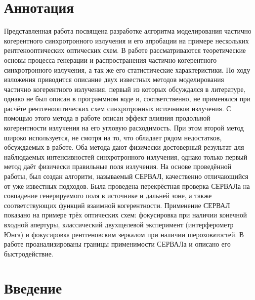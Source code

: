 \chapter*{Аннотация }							%
Представленная работа посвящена разработке алгоритма моделирования частично когерентного синхротронного излучения и его апробации на примере нескольких рентгенооптических оптических схем. В работе рассматриваются теоретические основы процесса генерации и распространения частично когерентного синхротронного излучения, а так же его статистические характеристики. По ходу изложения приводится описание двух известных методов моделирования частично когерентного излучения, первый из которых обсуждался в литературе, однако не был описан в программном коде и, соответственно, не применялся при расчёте рентгенооптических схем синхротронных источников излучения. С помощью этого метода в работе описан эффект влияния продольной когерентности излучения на его угловую расходимость. При этом второй метод широко используется, не смотря на то, что обладает рядом недостатков, обсуждаемых в работе. Оба метода дают физически достоверный результат для наблюдаемых интенсивностей синхротронного излучения, однако только первый метод даёт физически правильные поля излучения. На основе проведённой работы, был создан алгоритм, называемый СЕРВАЛ, качественно отличающийся от уже известных подходов. Была проведена перекрёстная проверка СЕРВАЛа на совпадение генерируемого поля в источнике и дальней зоне, а также соответствующих функций взаимной когерентности. Применение СЕРВАЛ показано на примере трёх оптических схем: фокусировка при наличии конечной входной апертуры, классический двухщелевой эксперимент (интерферометр Юнга) и фокусировка рентгеновским зеркалом при наличии шероховатостей. В работе проанализированы границы применимости СЕРВАЛа и описано его быстродействие.
\chapter*{Введение}							%

\newcommand{\actuality}{Актуальность}
\newcommand{\aim}{\textbf{Целью}}
\newcommand{\tasks}{Задачи}
\newcommand{\defpositions}{\textbf{Основные положения, выносимые на~защиту:}}
\newcommand{\novelty}{\textbf{Научная новизна}}
\newcommand{\influence}{\textbf{Научная и практическая значимость}}
\newcommand{\reliability}{\textbf{Степень достоверности}}
\newcommand{\probation}{\textbf{Апробация работы.}}
\newcommand{\contribution}{\textbf{Личный вклад.}}
\newcommand{\publications}{\textbf{Публикации.}}

